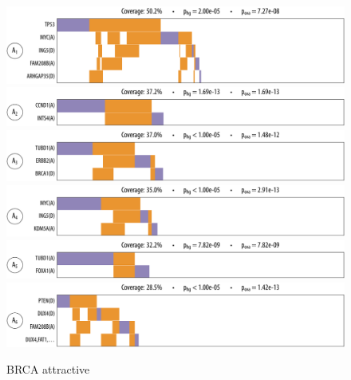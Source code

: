 \begin{figure}[htbp]
\centering
\includegraphics[width=\textwidth]{figures/genes/brca_1_a.pdf}\\[2em]
\includegraphics[width=\textwidth]{figures/genes/brca_11_a.pdf}\\[2em]
\includegraphics[width=\textwidth]{figures/genes/brca_7_a.pdf}\\[2em]
\includegraphics[width=\textwidth]{figures/genes/brca_8_a.pdf}\\[2em]
\includegraphics[width=\textwidth]{figures/genes/brca_14_a.pdf}\\[2em]
\includegraphics[width=\textwidth]{figures/genes/brca_4_a.pdf}\\[2em]
\caption{BRCA attractive}
\end{figure}

